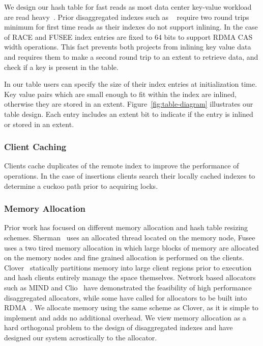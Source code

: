 We design our hash table for fast reads as most data center
key-value workload are read heavy~\cite{facebook-workloads}.
Prior disaggregated indexes such as
~\cite{clover,race,fusee} require two round trips minimum
for first time reads as their indexes do not support
inlining. In the case of RACE and FUSEE index entries are
fixed to 64 bits to support RDMA CAS width operations. This
fact prevents both projects from inlining key value data and
requires them to make a second round trip to an extent to
retrieve data, and check if a key is present in the table.

In our table users can specify the size of their index entries at
initialization time. Key value pairs which are small enough
to fit within the index are inlined, otherwise they are
stored in an extent. Figure~\ref{fig:table-diagram}
illustrates our table design. Each entry includes an extent
bit to indicate if the entry is inlined or stored in an
extent.

\subsubsection{Client Caching}

 Clients cache duplicates of the remote index
to improve the performance of operations. In the case of
insertions clients search their locally cached indexes to
determine a cuckoo path prior to acquiring locks. 

\subsubsection{Memory Allocation}

Prior work has focused on different memory allocation and
hash table resizing schemes. Sherman~\cite{sherman} uses an
allocated thread located on the memory node,
Fusee~\cite{fusee} uses a two tired memory allocation in
which large blocks of memory are allocated on the memory
nodes and fine grained allocation is performed on the
clients. Clover~\cite{clover} statically partitions memory
into large client regions prior to execution and hash
clients entirely manage the space themselves. Network based
allocators such as MIND and Clio~\cite{mind,clio} have
demonstrated the feasibility of high performance
disaggregated allocators, while some have called for
allocators to be built into RDMA~\cite{prism}. We allocate
memory using the same scheme as Clover, as it is simple to
implement and adds no additional overhead. We view memory
allocation as a hard orthogonal problem to the design of
disaggregated indexes and have designed our system
acrostically to the allocator.




